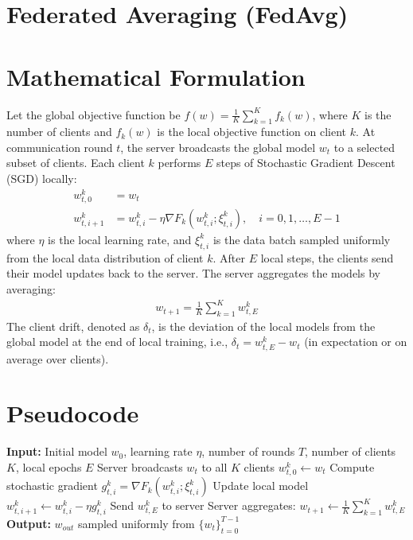 \documentclass{article}
\begin{document}
\section*{Federated Averaging (FedAvg)}

\section*{Mathematical Formulation}
Let the global objective function be $f(w) = \frac{1}{K} \sum_{k=1}^K f_k(w)$, where $K$ is the number of clients and $f_k(w)$ is the local objective function on client $k$. 
At communication round $t$, the server broadcasts the global model $w_t$ to a selected subset of clients. 
Each client $k$ performs $E$ steps of Stochastic Gradient Descent (SGD) locally:
\begin{align}
    w_{t,0}^k &= w_t \\
    w_{t,i+1}^k &= w_{t,i}^k - \eta \nabla F_k(w_{t,i}^k; \xi_{t,i}^k), \quad i = 0, 1, \dots, E-1
\end{align}
where $\eta$ is the local learning rate, and $\xi_{t,i}^k$ is the data batch sampled uniformly from the local data distribution of client $k$. 
After $E$ local steps, the clients send their model updates back to the server. The server aggregates the models by averaging:
\begin{align}
    w_{t+1} = \frac{1}{K} \sum_{k=1}^K w_{t,E}^k
\end{align}
The client drift, denoted as $\delta_t$, is the deviation of the local models from the global model at the end of local training, i.e., $\delta_t = w_{t,E}^k - w_t$ (in expectation or on average over clients).

\section*{Pseudocode}
\begin{algorithm}[H]
\caption{Federated Averaging (FedAvg)}
\begin{algorithmic}[1]
\State \textbf{Input:} Initial model $w_0$, learning rate $\eta$, number of rounds $T$, number of clients $K$, local epochs $E$
    \State Server broadcasts $w_t$ to all $K$ clients
        \State $w_{t,0}^k \gets w_t$
            \State Compute stochastic gradient $g_{t,i}^k = \nabla F_k(w_{t,i}^k; \xi_{t,i}^k)$
            \State Update local model $w_{t,i+1}^k \gets w_{t,i}^k - \eta g_{t,i}^k$
        \EndFor
        \State Send $w_{t,E}^k$ to server
    \EndFor
    \State Server aggregates: $w_{t+1} \gets \frac{1}{K} \sum_{k=1}^K w_{t,E}^k$
\EndFor
\State \textbf{Output:} $w_{out}$ sampled uniformly from $\{w_t\}_{t=0}^{T-1}$
\end{algorithmic}
\end{algorithm}
\end{document}
